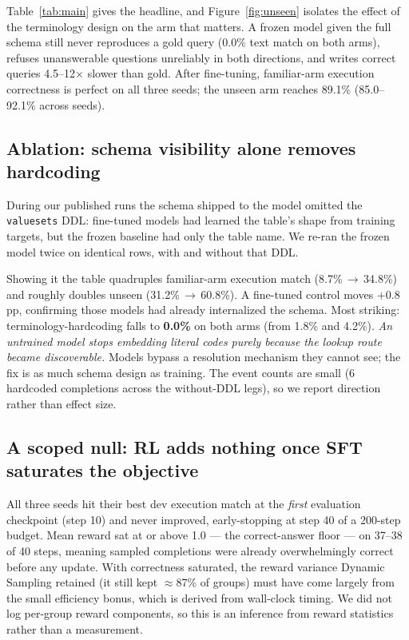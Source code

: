 \documentclass[pmlr,twocolumn,10pt]{jmlr} %
\begin{document}
Table~\ref{tab:main} gives the headline, and Figure~\ref{fig:unseen} isolates the
effect of the terminology design on the arm that matters. A frozen model given
the full schema still never reproduces a gold query (0.0\% text match on both
arms), refuses unanswerable questions unreliably in both directions, and writes
correct queries 4.5--12$\times$ slower than gold. After fine-tuning, familiar-arm
execution correctness is perfect on all three seeds; the unseen arm reaches
89.1\% (85.0--92.1\% across seeds).

\subsection{Ablation: schema visibility alone removes hardcoding}
\label{sec:abl}

During our published runs the schema shipped to the model omitted the
\texttt{valuesets} DDL: fine-tuned models had learned the table's shape from
training targets, but the frozen baseline had only the table name. We re-ran the
frozen model twice on identical rows, with and without that DDL.

Showing it the table quadruples familiar-arm execution match
(8.7\%\,$\rightarrow$\,34.8\%) and roughly doubles unseen
(31.2\%\,$\rightarrow$\,60.8\%). A fine-tuned control moves $+0.8$\,pp,
confirming those models had already internalized the schema. Most striking:
terminology-hardcoding falls to \textbf{0.0\%} on both arms (from 1.8\% and
4.2\%). \emph{An untrained model stops embedding literal codes purely because the
lookup route became discoverable.} Models bypass a resolution mechanism they
cannot see; the fix is as much schema design as training. The event counts are
small (6 hardcoded completions across the without-DDL legs), so we report
direction rather than effect size.

\subsection{A scoped null: RL adds nothing once SFT saturates the objective}

All three seeds hit their best dev execution match at the \emph{first}
evaluation checkpoint (step 10) and never improved, early-stopping at step 40 of
a 200-step budget. Mean reward sat at or above 1.0 --- the correct-answer floor
--- on 37--38 of 40 steps, meaning sampled completions were already
overwhelmingly correct before any update. With correctness saturated, the reward
variance Dynamic Sampling retained (it still kept $\approx$87\% of groups) must
have come largely from the small efficiency bonus, which is derived from
wall-clock timing. We did not log per-group reward components, so this is an
inference from reward statistics rather than a measurement.
\end{document}
